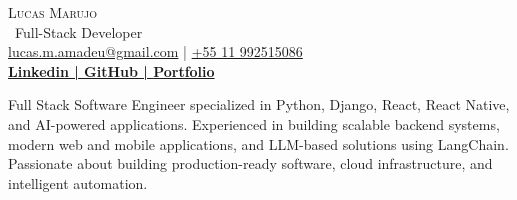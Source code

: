 


\vspace*{-40pt}

    \vspace*{-2pt}
    \begin{center}
        {\Huge \scshape {Lucas Marujo}}\\
        \vspace*{2pt}
        \ {Full-Stack Developer}\\
        \vspace*{2pt}
        \href{mailto:lucas.m.amadeu@gmail.com}{lucas.m.amadeu@gmail.com} | \href{tel:+55 11 992515086}{+55 11 992515086}\\
        \vspace*{4pt}
        \textbf{\href{https://www.linkedin.com/in/lucas-amadeu/}{Linkedin | }}\textbf{\href{http://github.com/lucasmarujo}{GitHub | }}\textbf{\href{https://marujo.dev/}{Portfolio}}\\
    \end{center}

    \vspace{2mm}
    Full Stack Software Engineer specialized in Python, Django, React, React Native, and AI-powered applications. Experienced in building scalable backend systems, modern web and mobile applications, and LLM-based solutions using LangChain. Passionate about building production-ready software, cloud infrastructure, and intelligent automation.
    \vspace{2mm}

    \vspace{2mm}

